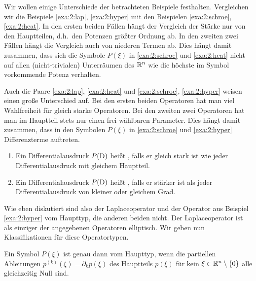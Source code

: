Wir wollen einige Unterschiede der betrachteten Beispiele festhalten.
Vergleichen wir die Beispiele \ref{exa:2:lap}, \ref{exa:2:hyper}
mit den Beispielen \ref{exa:2:schroe}, \ref{exa:2:heat}.
In den ersten beiden Fällen hängt der Vergleich der Stärke nur von den Hauptteilen,
d.h.~den Potenzen größter Ordnung ab.
In den zweiten zwei Fällen hängt die Vergleich auch von niederen Termen ab.
Dies hängt damit zusammen, dass sich die Symbole $P(\xi)$ in
\ref{exa:2:schroe} und \ref{exa:2:heat} nicht auf allen (nicht-trivialen)
Unterräumen des $\mathbb R^n$ wie die höchste im Symbol vorkommende Potenz verhalten.

Auch die Paare \ref{exa:2:lap}, \ref{exa:2:heat}
und \ref{exa:2:schroe}, \ref{exa:2:hyper}
weisen einen große Unterschied auf.
Bei den ersten beiden Operatoren hat man viel Wahlfreiheit
für gleich starke Operatoren.
Bei den zweiten zwei Operatoren hat man im Hauptteil stets
nur einen frei wählbaren Parameter.
Dies hängt damit zusammen, dass in den Symbolen $P(\xi)$
in \ref{exa:2:schroe} und \ref{exa:2:hyper} Differenzterme auftreten.

\begin{df}
\begin{enumerate}
\item
Ein Differentialausdruck $P(\mathrm D)$ heißt ,
falls er gleich stark ist wie jeder Differentialausdruck mit gleichem Hauptteil.
\item
Ein Differentialausdruck $P(\mathrm D)$ heißt ,
falls er stärker ist als jeder Differentialausdruck von kleiner oder gleichem Grad.
\end{enumerate}
\end{df}

Wie eben diskutiert sind also der Laplaceoperator
und der Operator aus Beispiel \ref{exa:2:hyper} vom Haupttyp,
die anderen beiden nicht. Der Laplaceoperator ist als einziger der angegebenen Operatoren elliptisch.
Wir geben nun Klassifikationen für diese Operatortypen.

\begin{thm}\label{thm:2:2.9}
Ein Symbol $P(\xi)$ ist genau dann vom Haupttyp,
wenn die partiellen Ableitungen $p^{(k)}(\xi)=\partial_k p(\xi)$
des Hauptteils $p(\xi)$ für kein $\xi\in\mathbb R^n\setminus\{0\}$
alle gleichzeitig Null sind.
\end{thm}

